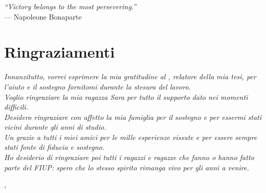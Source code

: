 
\cleardoublepage
{}
{}

\begin{flushright}{
	\slshape    
	``Victory belongs to the most persevering.''} \\ 
	\medskip
    --- Napoleone Bonaparte
\end{flushright}


\bigskip

\begingroup
\let\clearpage\relax
\let\cleardoublepage\relax
\let\cleardoublepage\relax

\chapter*{Ringraziamenti}

\noindent \textit{Innanzitutto, vorrei esprimere la mia gratitudine al \profTitle{} \myProf{}, relatore della mia tesi, per l'aiuto e il sostegno fornitomi durante la stesura del lavoro.}\\

\noindent \textit{Voglio ringraziare la mia ragazza Sara per tutto il supporto dato nei momenti difficili.} \\

\noindent \textit{Desidero ringraziare con affetto la mia famiglia per il sostegno e per essermi stati vicini durante gli anni di studio.}\\

\noindent \textit{Un grazie a tutti i miei amici per le mille esperienze vissute e per essere sempre stati fonte di fiducia e sostegno.}\\

\noindent \textit{Ho desiderio di ringraziare poi tutti i ragazzi e ragazze che fanno o hanno fatto parte del FIUP: spero che lo stesso spirito rimanga vivo per gli anni a venire.}

\bigskip

\noindent\textit{\myLocation, \myTime}
\hfill \myName

\endgroup

